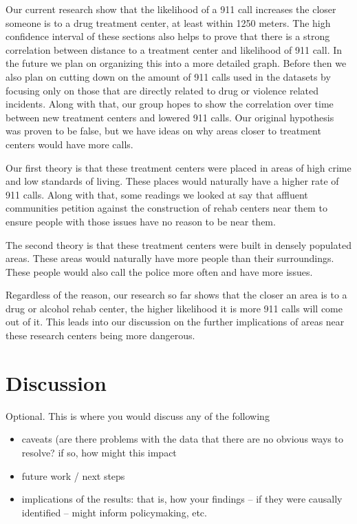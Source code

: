 \documentclass[12pt]{article}
\begin{document}
Our current research show that the likelihood of a 911 call increases the closer someone is to a drug treatment center, at least within 1250 meters. The high confidence interval of these sections also helps to prove that there is a strong correlation between distance to a treatment center and likelihood of 911 call. In the future we plan on organizing this into a more detailed graph. Before then we also plan on cutting down on the amount of 911 calls used in the datasets by focusing only on those that are directly related to drug or violence related incidents. Along with that, our group hopes to show the correlation over time between new treatment centers and lowered 911 calls. Our original hypothesis was proven to be false, but we have ideas on why areas closer to treatment centers would have more calls.

Our first theory is that these treatment centers were placed in areas of high crime and low standards of living. These places would naturally have a higher rate of 911 calls. Along with that, some readings we looked at say that affluent communities petition against the construction of rehab centers near them to ensure people with those issues have no reason to be near them.

The second theory is that these treatment centers were built in densely populated areas. These areas would naturally have more people than their surroundings. These people would also call the police more often and have more issues.

Regardless of the reason, our research so far shows that the closer an area is to a drug or alcohol rehab center, the higher likelihood it is more 911 calls will come out of it. This leads into our discussion on the further implications of areas near these research centers being more dangerous.

\section{Discussion}
\label{sec:discussion}

Optional. This is where you would discuss any of the following
\begin{itemize}
    \item caveats (are there problems with the data that there are no obvious ways to resolve? if so, how might this impact
    \item future work / next steps
    \item implications of the results: that is, how your findings -- if they were causally identified -- might inform policymaking, etc.
\end{itemize}
\end{document}
